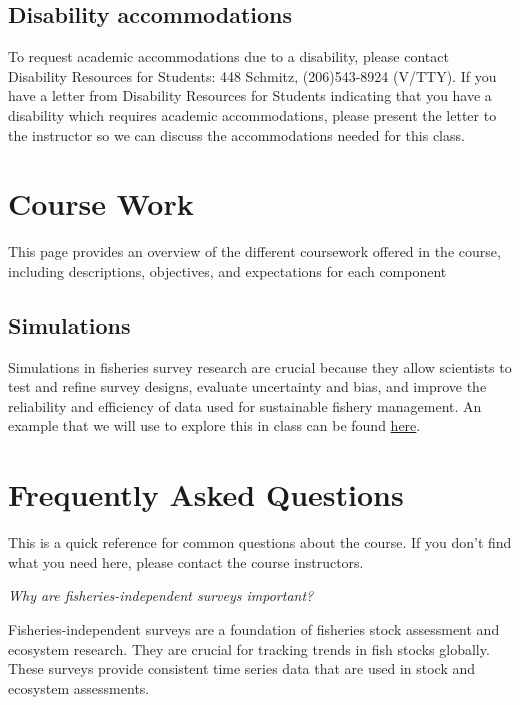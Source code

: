 \documentclass[
  letterpaper,
  oneside,
  open=any]{scrbook}
\begin{document}
\section{Disability accommodations}\label{disability-accommodations}

To request academic accommodations due to a disability, please contact
Disability Resources for Students: 448 Schmitz, (206)543-8924 (V/TTY).
If you have a letter from Disability Resources for Students indicating
that you have a disability which requires academic accommodations,
please present the letter to the instructor so we can discuss the
accommodations needed for this class.


\chapter{Course Work}\label{course-work}

This page provides an overview of the different coursework offered in
the course, including descriptions, objectives, and expectations for
each component

\section{Simulations}\label{simulations}

Simulations in fisheries survey research are crucial because they allow
scientists to test and refine survey designs, evaluate uncertainty and
bias, and improve the reliability and efficiency of data used for
sustainable fishery management. An example that we will use to explore
this in class can be found
\href{https://github.com/afsc-gap-products/UW-FISH572/tree/main/coursework/simulations/}{here}.


\chapter{Frequently Asked Questions}\label{frequently-asked-questions}

This is a quick reference for common questions about the course. If you
don't find what you need here, please contact the course instructors.

\emph{Why are fisheries-independent surveys important?}

Fisheries-independent surveys are a foundation of fisheries stock
assessment and ecosystem research. They are crucial for tracking trends
in fish stocks globally. These surveys provide consistent time series
data that are used in stock and ecosystem assessments.
\end{document}

